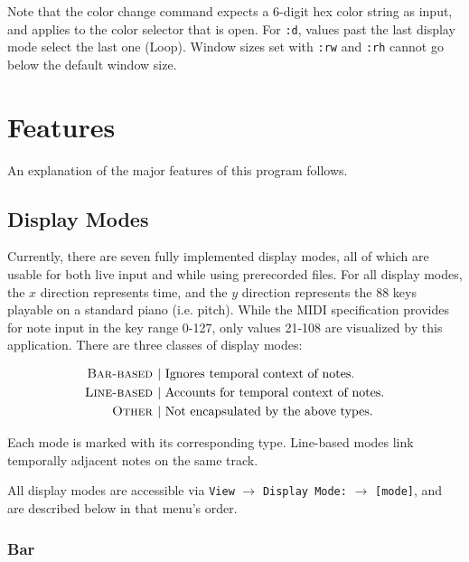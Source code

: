 \documentclass[english]{article}
\makeatletter
\newenvironment{restoretext}%
    {\@parboxrestore%
     \begin{adjustwidth}{}{\leftmargin}%
    }{\end{adjustwidth}
     }
\def\rcbegin{\begin{restoretext}\centering}
\def\rcend{\end{restoretext}}
\providecommand{\mi}[1]{\texttt{#1}}
\makeatother
\begin{document}
\vspace{1em}

Note that the color change command expects a 6-digit hex color string as input, and applies to the color selector that is open.
For \mi{:d}, values past the last display mode select the last one (Loop). Window sizes set with \mi{:rw} and \mi{:rh} cannot go below
the default window size.

\newpage
\section{Features}

An explanation of the major features of this program follows.

\subsection{Display Modes}

Currently, there are seven fully implemented display modes, all of which are usable for both live input and
while using prerecorded files. For all display modes, the $x$ direction represents time, and the $y$ direction
represents the 88 keys playable on a standard piano (i.e. pitch). While the MIDI specification provides for note 
input in the key range
0-127, only values 21-108 are visualized by this application. There are three classes of display modes:

\rcbegin
\begin{align*}
  \textsc{Bar-based }  | & \text{ Ignores temporal context of notes.}\\
  \textsc{Line-based } | & \text{ Accounts for temporal context of notes.}\\
  \textsc{Other }      | & \text{ Not encapsulated by the above types.}\\
\end{align*}
\rcend

Each mode is marked with its corresponding type. Line-based modes link temporally adjacent notes on the same track.

All display modes are accessible via 
\mi{View} $\rightarrow$ \mi{Display Mode:} $\rightarrow$ \mi{[mode]}, and are described below in that menu's order.

\newpage

\subsubsection{Bar}
\end{document}
